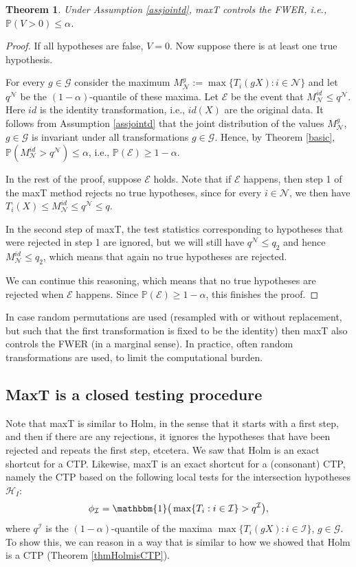 \documentclass[11pt]{article}
\theoremstyle{plain}
\newtheorem{theorem}{Theorem}[section]
\theoremstyle{definition}
\newcommand{\N}{\mathcal{N}}
\newcommand{\I}{\mathcal{I}}
\newcommand{\G}{\mathcal{G}}
\newcommand{\E}{\mathcal{E}}
\newcommand{\Hy}{\mathcal{H}}
\newcommand{\pr}{\mathbb{P}}
\begin{document}
\begin{theorem} \label{thmmaxTvalid}
Under Assumption \ref{assjointd}, maxT controls the FWER, i.e., $\pr(V>0)\leq\alpha$.
\end{theorem}
\begin{proof}
If all hypotheses are false, $V=0$. Now suppose there is at least one true hypothesis.

For every $g\in \G$ consider the maximum $M_{\N}^g:=\max\{T_i(gX):i\in \N\}$ and let $q^{\N}$ be the $(1-\alpha)$-quantile of these maxima. Let $\E$ be the event that $M_{\N}^{id}\leq q^{\N}$. Here $id$ is the identity transformation, i.e., $id(X)$ are the original data. 
It follows from Assumption \ref{assjointd} that the joint distribution of the values $M_{\N}^{g}$, $g\in \G$ is invariant under all transformations  $g\in \G$. Hence, by Theorem \ref{basic}, $\pr(M_{\N}^{id}> q^{\N})\leq \alpha$, i.e., $\pr(\E)\geq 1-\alpha$.

 In the rest of the proof, suppose $\E$ holds.
Note that if $\E$ happens, then step 1 of the  maxT method rejects no true hypotheses, since for every $i\in \N$, we then have $T_{i}(X)\leq M_{\N}^{id}\leq q^{\N}\leq q$.

In the second step of maxT, the test statistics corresponding to hypotheses that were rejected in step 1 are ignored, but we will still have $q^{\N}\leq q_2$ and hence $M_{\N}^{id}\leq q_2$, which means that again no true hypotheses are rejected. 

We can continue this reasoning, which means that  no true hypotheses are rejected when $\E$ happens. Since $\pr(\E)\geq 1-\alpha$, this finishes the proof.
\end{proof}
In case random permutations are used (resampled with or without replacement, but such that the first transformation is fixed to be the identity) then maxT also controls the FWER (in a marginal sense). In practice, often random transformations are used, to limit the computational burden.


\subsection{MaxT is a closed testing procedure} \label{secmaxTCTP}
Note that maxT is  similar to Holm, in the sense that it starts with a first step, and then if there are any rejections, it ignores the hypotheses that have been rejected and repeats the first step, etcetera. We saw that Holm is an exact shortcut for a CTP. Likewise, maxT is an exact shortcut for a (consonant) CTP,
namely the CTP based on the following local tests for the intersection hypotheses $\Hy_I$:
\begin{equation} \label{eqltmaxT}
\phi_{\I}= \mathbbm{1}\big( \max\{T_i:i\in\I\} > q^{\I}  \big),
\end{equation}
where 
$q^{\I}$ is the $(1-\alpha)$-quantile  of the maxima  $\max\{T_i(gX):i\in \I\}$, $g\in \G$.
To show this, we can reason in a way that is similar to how we showed that Holm is a CTP (Theorem \ref{thmHolmisCTP}). 
\end{document}
